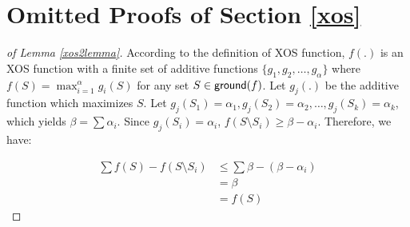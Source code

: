 \section{Omitted Proofs of Section \ref{xos}}\label{xosappendix}

\begin{proof}[of Lemma \ref{xos2lemma}]
According to the definition of XOS function, $f(.)$ is an XOS function with a finite set of additive functions $\{g_1, g_2, \ldots, g_{\alpha}\}$ where $f(S) = \max_{i=1}^{\alpha} g_i(S)$ for any set $S \in \mathsf{ground}(f)$. Let $g_j(.)$ be the additive function which maximizes $S$. Let $g_j(S_1) = \alpha_1, g_j(S_2) = \alpha_2, \ldots, g_j(S_k) = \alpha_k$, which yields $\beta = \sum \alpha_i$. Since $g_j(S_i) = \alpha_i$, $f(S \setminus S_i) \geq \beta - \alpha_i$. Therefore, we have:

\begin{equation}
    \label{hineq15}
    \begin{split}
    \sum f(S) - f(S \setminus S_i) &\leq \sum \beta - (\beta - \alpha_i)\\
    &= \beta\\
    &= f(S)
    \end{split}
\end{equation}


\end{proof}




